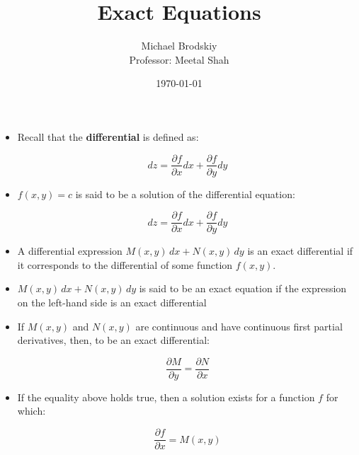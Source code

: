 \documentclass[12pt]{article}
\title{Exact Equations}
\date{\today}
\author{Michael Brodskiy\\ \small Professor: Meetal Shah}
\begin{document}
\maketitle

\begin{itemize}

  \item Recall that the \textbf{differential} is defined as:

    $$dz=\frac{\partial f}{\partial x}dx+\frac{\partial f}{\partial y}dy$$

  \item $f(x,y)=c$ is said to be a solution of the differential equation:

    $$dz=\frac{\partial f}{\partial x}dx+\frac{\partial f}{\partial y}dy$$

  \item A differential expression $M(x,y)\,dx+N(x,y)\,dy$ is an exact differential if it corresponds to the differential of some function $f(x,y)$.

  \item $M(x,y)\,dx+N(x,y)\,dy$ is said to be an exact equation if the expression on the left-hand side is an exact differential

  \item If $M(x,y)$ and $N(x,y)$ are continuous and have continuous first partial derivatives, then, to be an exact differential:

    $$\frac{\partial M}{\partial y}=\frac{\partial N}{\partial x}$$

  \item If the equality above holds true, then a solution exists for a function $f$ for which:

    $$\frac{\partial f}{\partial x}=M(x,y)$$

\end{itemize}
\end{document}
